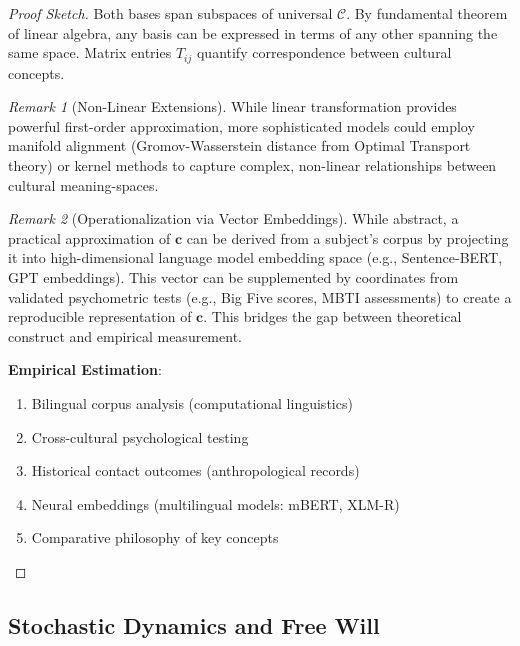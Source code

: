 \documentclass[11pt,a4paper]{article}
\theoremstyle{definition}
\theoremstyle{remark}
\newtheorem{remark}{Remark}[section]
\newcommand{\CC}{\mathcal{C}}
\newcommand{\cc}{\mathbf{c}}
\begin{document}
\begin{proof}[Proof Sketch]
Both bases span subspaces of universal \(\CC\). By fundamental theorem of linear algebra, any basis can be expressed in terms of any other spanning the same space. Matrix entries \(T_{ij}\) quantify correspondence between cultural concepts.

\begin{remark}[Non-Linear Extensions]
While linear transformation provides powerful first-order approximation, more sophisticated models could employ manifold alignment (Gromov-Wasserstein distance from Optimal Transport theory) or kernel methods to capture complex, non-linear relationships between cultural meaning-spaces.
\end{remark}

\begin{remark}[Operationalization via Vector Embeddings]
While abstract, a practical approximation of \(\cc\) can be derived from a subject's corpus by projecting it into high-dimensional language model embedding space (e.g., Sentence-BERT, GPT embeddings). This vector can be supplemented by coordinates from validated psychometric tests (e.g., Big Five scores, MBTI assessments) to create a reproducible representation of \(\cc\). This bridges the gap between theoretical construct and empirical measurement.
\end{remark}

\textbf{Empirical Estimation}:
\begin{enumerate}
\item Bilingual corpus analysis (computational linguistics)
\item Cross-cultural psychological testing
\item Historical contact outcomes (anthropological records)
\item Neural embeddings (multilingual models: mBERT, XLM-R)
\item Comparative philosophy of key concepts
\end{enumerate}
\end{proof}

\subsection{Stochastic Dynamics and Free Will}
\end{document}
